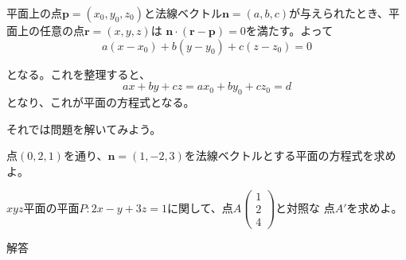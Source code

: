\documentclass{jlreq}
\begin{document}
\begin{theorembox}[平面の方程式]
  平面上の点$\boldsymbol{p} = (x_0, y_0, z_0)$と法線ベクトル$\boldsymbol{n} = (a, b, c)$が与えられたとき、平面上の任意の点$\boldsymbol{r} = (x, y, z)$は
  $\boldsymbol{n} \cdot (\boldsymbol{r} - \boldsymbol{p}) = 0$を満たす。よって
  \begin{equation*}
    a(x - x_0) + b(y - y_0) + c(z - z_0) = 0
  \end{equation*}

  となる。これを整理すると、
  \begin{equation*}
    ax + by + cz = a x_0 + b y_0 + c z_0 = d
  \end{equation*}
   となり、これが平面の方程式となる。
\end{theorembox}

それでは問題を解いてみよう。

\begin{problem}
  点$(0, 2, 1)$を通り、$\boldsymbol{n} = (1, -2, 3)$を法線ベクトルとする平面の方程式を求めよ。
\end{problem}

\begin{problem}
  $xyz$平面の平面$P: 2x - y + 3z = 1$に関して、点$A \begin{pmatrix} 1 \\ 2 \\ 4 \end{pmatrix}$と対照な
  点$A'$を求めよ。

  \dotfill
  解答 \\
\end{problem}
\end{document}

